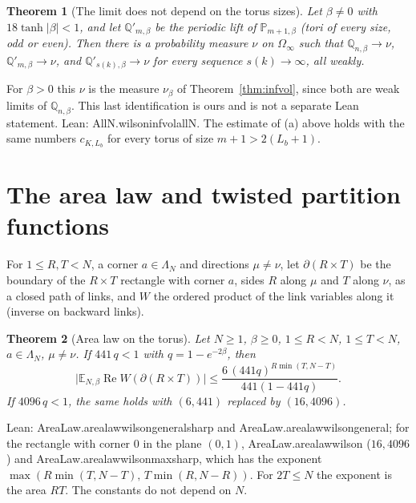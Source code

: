 \documentclass[11pt,a4paper]{article}
\newtheorem{theorem}{Theorem}[section]
\theoremstyle{definition}
\theoremstyle{remark}
\newcommand{\leanus}{\textunderscore\allowbreak{}}
\newcommand{\leandot}{.\allowbreak{}}
\newcommand{\lean}[1]{{\ttfamily\let\_\leanus #1}}
\renewcommand{\Re}{\operatorname{Re}}
\begin{document}
\begin{theorem}[The limit does not depend on the torus sizes]\label{thm:allN}
Let $\beta\ne0$ with $18\tanh|\beta|<1$, and let $\mathbb Q'_{m,\beta}$ be the periodic lift of $\mathbb P_{m+1,\beta}$ (tori of every size, odd or even). Then there is a probability measure $\nu$ on $\Omega_\infty$ such that $\mathbb Q_{n,\beta}\to\nu$, $\mathbb Q'_{m,\beta}\to\nu$, and $\mathbb Q'_{s(k),\beta}\to\nu$ for every sequence $s(k)\to\infty$, all weakly.
\end{theorem}
For $\beta>0$ this $\nu$ is the measure $\nu_\beta$ of Theorem~\ref{thm:infvol}, since both are weak limits of $\mathbb Q_{n,\beta}$. This last identification is ours and is not a separate Lean statement.
Lean: \lean{AllN\leandot{}wilson\_infvol\_allN}. The estimate of (a) above holds with the same numbers $c_{K,L_b}$ for every torus of size $m+1>2(L_b+1)$.

\section{The area law and twisted partition functions}\label{sec:area}

For $1\le R,T<N$, a corner $a\in\Lambda_N$ and directions $\mu\ne\nu$, let $\partial(R\times T)$ be the boundary of the $R\times T$ rectangle with corner $a$, sides $R$ along $\mu$ and $T$ along $\nu$, as a closed path of links, and $W$ the ordered product of the link variables along it (inverse on backward links).

\begin{theorem}[Area law on the torus]\label{thm:area}
Let $N\ge1$, $\beta\ge0$, $1\le R<N$, $1\le T<N$, $a\in\Lambda_N$, $\mu\ne\nu$. If $441\,q<1$ with $q=1-e^{-2\beta}$, then
\[
\bigl|\mathbb E_{N,\beta}\Re W(\partial(R\times T))\bigr|\le\frac{6\,(441q)^{R\min(T,N-T)}}{441(1-441q)}.
\]
If $4096\,q<1$, the same holds with $(6,441)$ replaced by $(16,4096)$.
\end{theorem}
Lean: \lean{AreaLaw\leandot{}area\_law\_wilson\_general\_sharp} and \lean{AreaLaw\leandot{}area\_law\_wilson\_general}; for the rectangle with corner $0$ in the plane $(0,1)$, \lean{AreaLaw\leandot{}area\_law\_wilson} ($16,4096$) and \lean{AreaLaw\leandot{}area\_law\_wilson\_max\_sharp}, which has the exponent $\max(R\min(T,N-T),\,T\min(R,N-R))$. For $2T\le N$ the exponent is the area $RT$. The constants do not depend on $N$.
\end{document}
